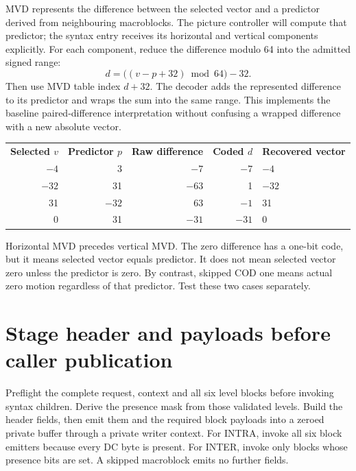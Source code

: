 MVD represents the difference between the selected vector and a predictor derived
from neighbouring macroblocks. The picture controller will compute that predictor;
the syntax entry receives its horizontal and vertical components explicitly.
For each component, reduce the difference modulo 64 into the admitted signed range:
\[
  d=\bigl((v-p+32)\bmod64\bigr)-32.
\]
Then use MVD table index $d+32$. The decoder adds the represented difference to
its predictor and wraps the sum into the same range. This implements the baseline
paired-difference interpretation without confusing a wrapped difference with a
new absolute vector.

\begin{center}
  \begin{tabular}{rrrrl}
    \textbf{Selected $v$} & \textbf{Predictor $p$} & \textbf{Raw difference} & \textbf{Coded $d$} & \textbf{Recovered vector} \\
    $-4$                  & 3                      & $-7$                    & $-7$               & $-4$                      \\
    $-32$                 & 31                     & $-63$                   & 1                  & $-32$                     \\
    31                    & $-32$                  & 63                      & $-1$               & 31                        \\
    0                     & 31                     & $-31$                   & $-31$              & 0
  \end{tabular}
\end{center}
Horizontal MVD precedes vertical MVD. The zero difference has a one-bit code, but
it means selected vector equals predictor. It does not mean selected vector zero
unless the predictor is zero. By contrast, skipped COD one means actual zero
motion regardless of that predictor. Test these two cases separately.

\section{Stage header and payloads before caller publication}
Preflight the complete request, context and all six level blocks before invoking
syntax children. Derive the presence mask from those validated levels. Build the
header fields, then emit them and the required block payloads into a zeroed private
buffer through a private writer context. For INTRA, invoke all six block emitters
because every DC byte is present. For INTER, invoke only blocks whose presence
bits are set. A skipped macroblock emits no further fields.

